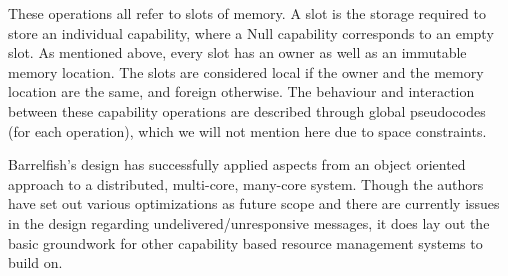 These operations all refer to slots of memory. A slot is the storage required to store an individual capability, where a Null capability corresponds to an empty slot. As mentioned above, every slot has an owner as well as an immutable memory location. The slots are considered local if the owner and the memory location are the same, and foreign otherwise. The behaviour and interaction between these capability operations are described through global pseudocodes (for each operation), which we will not mention here due to space constraints.

Barrelfish's design has successfully applied aspects from an object oriented approach to a distributed, multi-core, many-core system. Though the authors have set out various optimizations as future scope and there are currently issues in the design regarding undelivered/unresponsive messages, it does lay out the basic groundwork for other capability based resource management systems to build on.